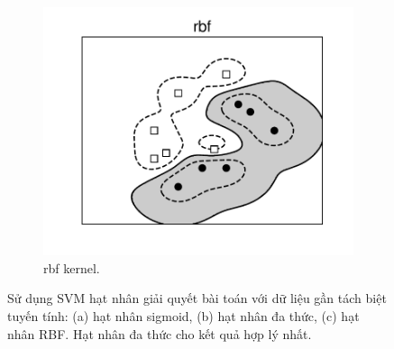 \begin{figure}[t]
\begin{subfigure}{0.325\textwidth}
\includegraphics[width=\linewidth]{Chapters/09_SupportVectorMachines/21_kernelsvm/plt/rbf3.pdf}
\caption{rbf kernel.}
\end{subfigure}

\caption{
Sử dụng SVM hạt nhân giải quyết bài toán với dữ liệu {gần tách biệt
tuyến tính}: (a) hạt nhân sigmoid, (b) hạt nhân đa thức, (c) hạt nhân RBF. Hạt nhân đa thức cho kết quả hợp lý nhất. }
\label{fig:21_3}
\end{figure}






